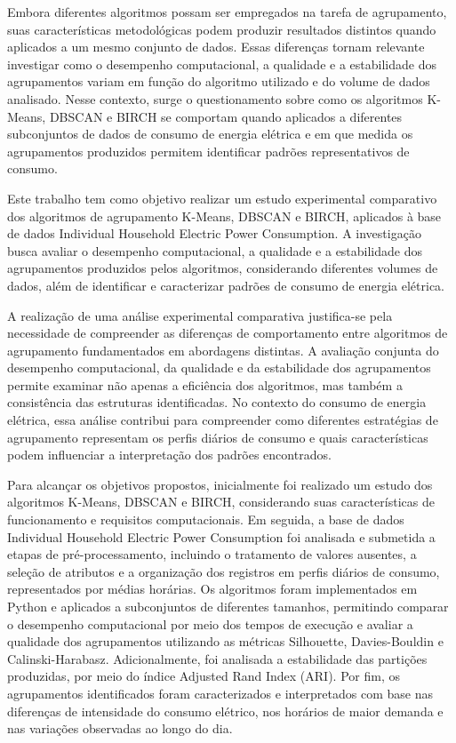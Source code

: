 \documentclass[lettersize,journal]{IEEEtran}
\begin{document}
Embora diferentes algoritmos possam ser empregados na tarefa de agrupamento, suas características metodológicas podem produzir resultados distintos quando aplicados a um mesmo conjunto de dados. Essas diferenças tornam relevante investigar como o desempenho computacional, a qualidade e a estabilidade dos agrupamentos variam em função do algoritmo utilizado e do volume de dados analisado. Nesse contexto, surge o questionamento sobre como os algoritmos K-Means, DBSCAN e BIRCH se comportam quando aplicados a diferentes subconjuntos de dados de consumo de energia elétrica e em que medida os agrupamentos produzidos permitem identificar padrões representativos de consumo.

Este trabalho tem como objetivo realizar um estudo experimental comparativo dos algoritmos de agrupamento K-Means, DBSCAN e BIRCH, aplicados à base de dados Individual Household Electric Power Consumption. A investigação busca avaliar o desempenho computacional, a qualidade e a estabilidade dos agrupamentos produzidos pelos algoritmos, considerando diferentes volumes de dados, além de identificar e caracterizar padrões de consumo de energia elétrica.

A realização de uma análise experimental comparativa justifica-se pela necessidade de compreender as diferenças de comportamento entre algoritmos de agrupamento fundamentados em abordagens distintas. A avaliação conjunta do desempenho computacional, da qualidade e da estabilidade dos agrupamentos permite examinar não apenas a eficiência dos algoritmos, mas também a consistência das estruturas identificadas. No contexto do consumo de energia elétrica, essa análise contribui para compreender como diferentes estratégias de agrupamento representam os perfis diários de consumo e quais características podem influenciar a interpretação dos padrões encontrados.

Para alcançar os objetivos propostos, inicialmente foi realizado um estudo dos algoritmos K-Means, DBSCAN e BIRCH, considerando suas características de funcionamento e requisitos computacionais. Em seguida, a base de dados Individual Household Electric Power Consumption foi analisada e submetida a etapas de pré-processamento, incluindo o tratamento de valores ausentes, a seleção de atributos e a organização dos registros em perfis diários de consumo, representados por médias horárias. Os algoritmos foram implementados em Python e aplicados a subconjuntos de diferentes tamanhos, permitindo comparar o desempenho computacional por meio dos tempos de execução e avaliar a qualidade dos agrupamentos utilizando as métricas Silhouette, Davies-Bouldin e Calinski-Harabasz. Adicionalmente, foi analisada a estabilidade das partições produzidas, por meio do índice Adjusted Rand Index (ARI). Por fim, os agrupamentos identificados foram caracterizados e interpretados com base nas diferenças de intensidade do consumo elétrico, nos horários de maior demanda e nas variações observadas ao longo do dia.
\end{document}
